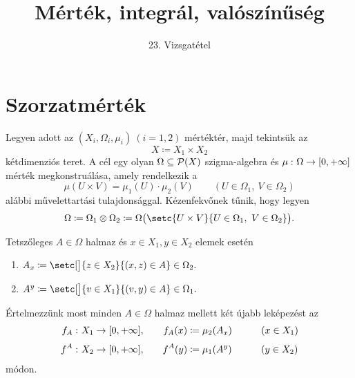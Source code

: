 \documentclass[
]{elteikthesis}[2024/04/26]
\title{Mérték, integrál, valószínűség} %
\subtitle{23. Vizsgatétel}
\begin{document}
	
	
	\section{Szorzatmérték}
	
	Legyen adott az \( (X_i, \Omega_i, \mu_i) \ (i=1,2) \) mértéktér, majd tekintsük az
	\[
		X \coloneq X_1 \times X_2
	\]
	kétdimenziós teret.
	A cél egy olyan \( \Omega \subseteq \mathcal{P}( X ) \) szigma-algebra és 
	\( \mu \,\colon \Omega \to [0, +\infty] \) mérték megkonstruálása,
	amely rendelkezik a
	\[
		\mu(U \times V) = \mu_1(U) \cdot \mu_2(V) 
		\qquad (U \in \Omega_1, \ V \in \Omega_2)
	\]
	alábbi művelettartási tulajdonsággal.
	Kézenfekvőnek tűnik, hogy legyen
	\[
		\Omega \coloneq
		\Omega_1 \otimes \Omega_2 \coloneq
		\Omega \bigl( \setc{ U \times V }{ U \in \Omega_1, \ V \in \Omega_2 } \bigr).
	\]
	
	\begin{statement}{}{}
		Tetszőleges \( A \in \Omega \) halmaz 
		és \( x \in X_1, y \in X_2 \) elemek esetén
		\begin{enumerate}[label=\alph*)]
			\item \( A_x \coloneq \setc[\big]{ z \in X_2 }{ (x, z) \in A } \in \Omega_2. \)
			\item \( A^y \coloneq \setc[\big]{ v \in X_1 }{ (v, y) \in A } \in \Omega_1. \)
		\end{enumerate}
	\end{statement}
	
	\noindent
	Értelmezzünk most minden \( A \in \Omega \) halmaz mellett két újabb leképezést az
	\begin{alignat*}{3}
		f_A \,\colon X_1 \to [0, +\infty],& \quad 
		&{} f_A(x) &\coloneq \mu_2(A_x) \qquad &&(x \in X_1) \\[3pt]
		f^A \,\colon X_2 \to [0, +\infty],& \quad 
		&{} f^A(y) &\coloneq \mu_1(A^y) \qquad &&(y \in X_2)
	\end{alignat*}
	módon.
	
\end{document}
